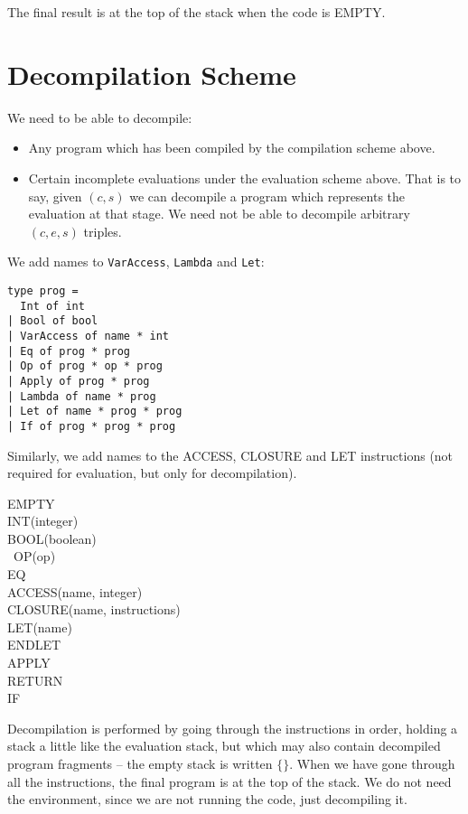 \documentclass[11pt]{article}
\begin{document}
\bigskip

\noindent The final result is at the top of the stack when the code is EMPTY.

\section{Decompilation Scheme}

We need to be able to decompile:

\begin{itemize}
\item Any program which has been compiled by the compilation scheme above.
\item Certain incomplete evaluations under the evaluation scheme above. That is to say, given $(c, s)$ we can decompile a program which represents the evaluation at that stage. We need not be able to decompile arbitrary $(c, e, s)$ triples.
\end{itemize}

\noindent  We add names to \texttt{VarAccess}, \texttt{Lambda} and \texttt{Let}:

\begin{verbatim}
type prog =
  Int of int
| Bool of bool
| VarAccess of name * int
| Eq of prog * prog
| Op of prog * op * prog
| Apply of prog * prog
| Lambda of name * prog
| Let of name * prog * prog
| If of prog * prog * prog\end{verbatim}

\noindent Similarly, we add names to the ACCESS, CLOSURE and LET instructions (not required for evaluation, but only for decompilation).

\bigskip

\noindent
EMPTY\\
INT(integer)\\
BOOL(boolean)\\\
OP(op)\\
EQ\\
ACCESS(name, integer)\\
CLOSURE(name, instructions)\\
LET(name)\\
ENDLET\\
APPLY\\
RETURN\\
IF
\medskip

\noindent Decompilation is performed by going through the instructions in order, holding a stack a little like the evaluation stack, but which may also contain decompiled program fragments -- the empty stack is written $\{\}$. When we have gone through all the instructions, the final program is at the top of the stack. We do not need the environment, since we are not running the code, just decompiling it.
\end{document}

